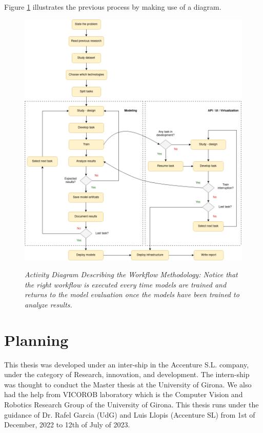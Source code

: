 Figure \ref{fig:flux_development} illustrates the previous process by making use of a diagram.

\newpage


\begin{figure}[H]
  \centering
  \includegraphics[width=\textwidth]{imatges/planing_and_methodology/EmplyedMethodology.png}
  \caption[Activity Diagram Describing the Methodology.]{\textit{Activity
  Diagram Describing the Workflow Methodology: Notice that the right workflow
  is executed every time models are trained and returns to the model evaluation
  once the models have been trained to analyze results.}}
  {\label{fig:flux_development}}
\end{figure}


\newpage


\section{Planning}

This thesis was developed under an inter-ship in the Accenture S.L. company,
under the category of Research, innovation, and development. The intern-ship
was thought to conduct the Master thesis at the University of Girona. We also
had the help from VICOROB laboratory which is the Computer Vision and Robotics
Research Group of the University of Girona. This thesis runs under the guidance
of Dr. Rafel Garcia (UdG) and Luis Llopis (Accenture SL) from 1st of December,
2022 to 12th of July of 2023. \\

